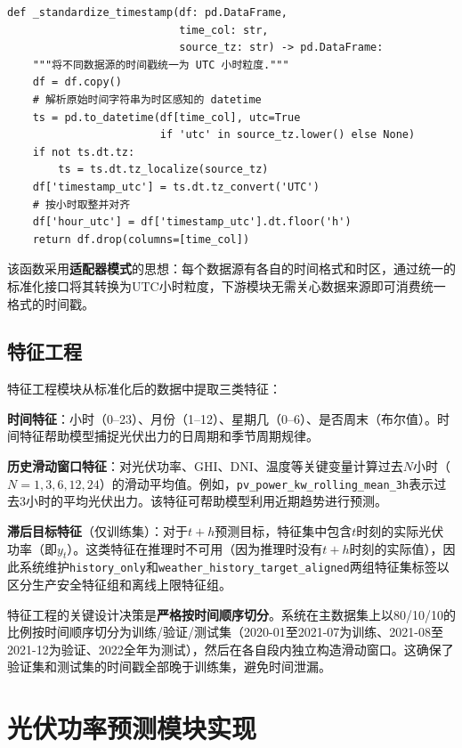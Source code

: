 \documentclass[12pt,a4paper]{ctexbook}
\begin{document}
\begin{lstlisting}[caption={时间标准化核心逻辑（精简自 cleaning.py）}, label={lst:time-align}]
def _standardize_timestamp(df: pd.DataFrame,
                           time_col: str,
                           source_tz: str) -> pd.DataFrame:
    """将不同数据源的时间戳统一为 UTC 小时粒度."""
    df = df.copy()
    # 解析原始时间字符串为时区感知的 datetime
    ts = pd.to_datetime(df[time_col], utc=True
                        if 'utc' in source_tz.lower() else None)
    if not ts.dt.tz:
        ts = ts.dt.tz_localize(source_tz)
    df['timestamp_utc'] = ts.dt.tz_convert('UTC')
    # 按小时取整并对齐
    df['hour_utc'] = df['timestamp_utc'].dt.floor('h')
    return df.drop(columns=[time_col])
\end{lstlisting}

该函数采用\textbf{适配器模式}的思想：每个数据源有各自的时间格式和时区，通过统一的标准化接口将其转换为UTC小时粒度，下游模块无需关心数据来源即可消费统一格式的时间戳。

\subsection{特征工程}

特征工程模块从标准化后的数据中提取三类特征：

\textbf{时间特征}：小时（0--23）、月份（1--12）、星期几（0--6）、是否周末（布尔值）。时间特征帮助模型捕捉光伏出力的日周期和季节周期规律。

\textbf{历史滑动窗口特征}：对光伏功率、GHI、DNI、温度等关键变量计算过去$N$小时（$N=1,3,6,12,24$）的滑动平均值。例如，\texttt{pv\_power\_kw\_rolling\_mean\_3h}表示过去3小时的平均光伏出力。该特征可帮助模型利用近期趋势进行预测。

\textbf{滞后目标特征}（仅训练集）：对于$t+h$预测目标，特征集中包含$t$时刻的实际光伏功率（即$y_t$）。这类特征在推理时不可用（因为推理时没有$t+h$时刻的实际值），因此系统维护\texttt{history\_only}和\texttt{weather\_history\_target\_aligned}两组特征集标签以区分生产安全特征组和离线上限特征组。

特征工程的关键设计决策是\textbf{严格按时间顺序切分}。系统在主数据集上以80/10/10的比例按时间顺序切分为训练/验证/测试集（2020-01至2021-07为训练、2021-08至2021-12为验证、2022全年为测试），然后在各自段内独立构造滑动窗口。这确保了验证集和测试集的时间戳全部晚于训练集，避免时间泄漏。

\section{光伏功率预测模块实现}
\end{document}
